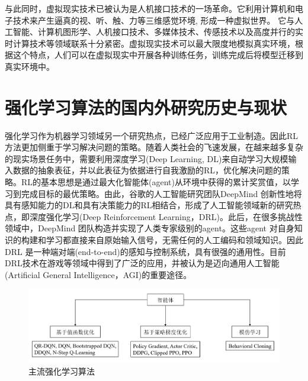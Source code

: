 \documentclass[bachelor]{thesis-uestc}
\begin{document}
	与此同时，虚拟现实技术已被认为是人机接口技术的一场革命。它利用计算机和电子技术来产生逼真的视、听、触、力等三维感觉环境, 形成一种虚拟世界。 它与人工智能、计算机图形学、人机接口技术、多媒体技术、传感技术以及高度并行的实时计算技术等领域联系十分紧密。虚拟现实技术可以最大限度地模拟真实环境，根据这个特点，人们可以在虚拟现实中开展各种训练任务，训练完成后将模型迁移到真实环境中。
	
	\section{强化学习算法的国内外研究历史与现状}
	强化学习作为机器学习领域另一个研究热点，已经广泛应用于工业制造。因此RL 方法更加侧重于学习解决问题的策略。随着人类社会的飞速发展，在越来越多复杂的现实场景任务中，需要利用深度学习(Deep Learning, DL)来自动学习大规模输入数据的抽象表征，并以此表征为依据进行自我激励的RL，优化解决问题的策略。RL的基本思想是通过最大化智能体(agent)从环境中获得的累计奖赏值，以学习到完成目标的最优策略。由此，谷歌的人工智能研究团队DeepMind 创新性地将具有感知能力的DL和具有决策能力的RL相结合，形成了人工智能领域新的研究热点，即深度强化学习(Deep Reinforcement Learning，DRL)。此后，在很多挑战性领域中，DeepMind 团队构造并实现了人类专家级别的agent。这些agent 对自身知识的构建和学习都直接来自原始输入信号，无需任何的人工编码和领域知识。因此DRL 是一种端对端(end-to-end)的感知与控制系统，具有很强的通用性。目前DRL技术在游戏等领域中得到了广泛的应用，并被认为是迈向通用人工智能(Artificial General Intelligence，AGI)的重要途径。
	
	\begin{figure}
		\includegraphics[width=15cm]{./pic/fg6.jpg}
		\caption{主流强化学习算法}
		\label{fg6}
	\end{figure}
	
\end{document}
